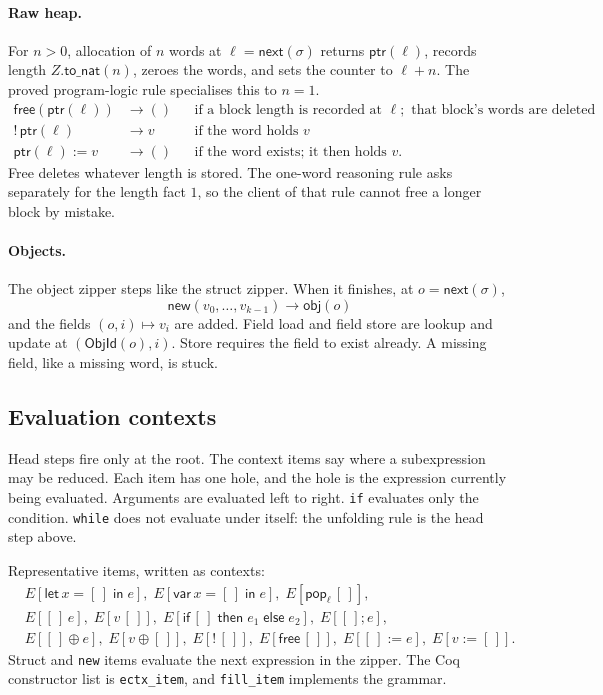 \documentclass[11pt]{article}
\newcommand{\step}{\longrightarrow}
\newcommand{\Unit}{\mathsf{()}}
\begin{document}
\paragraph{Raw heap.}
For \(n>0\), allocation of \(n\) words at \(\ell=\mathsf{next}(\sigma)\) returns \(\mathsf{ptr}(\ell)\), records length \(Z.\mathsf{to\_nat}(n)\), zeroes the words, and sets the counter to \(\ell+n\).
The proved program-logic rule specialises this to \(n=1\).
\begin{align*}
\mathsf{free}(\mathsf{ptr}(\ell))
  &\step \Unit
  &&\text{if a block length is recorded at }\ell;
     \text{ that block's words are deleted}\\
{!}\,\mathsf{ptr}(\ell)
  &\step v
  &&\text{if the word holds }v\\
\mathsf{ptr}(\ell) := v
  &\step \Unit
  &&\text{if the word exists; it then holds }v.
\end{align*}
Free deletes whatever length is stored.
The one-word reasoning rule asks separately for the length fact \(1\), so the client of that rule cannot free a longer block by mistake.

\paragraph{Objects.}
The object zipper steps like the struct zipper.
When it finishes, at \(o=\mathsf{next}(\sigma)\),
\[
\mathsf{new}(v_0,\ldots,v_{k-1})
\step
\mathsf{obj}(o)
\]
and the fields \((o,i)\mapsto v_i\) are added.
Field load and field store are lookup and update at \((\mathsf{ObjId}(o), i)\).
Store requires the field to exist already.
A missing field, like a missing word, is stuck.

\subsection{Evaluation contexts}

Head steps fire only at the root.
The context items say where a subexpression may be reduced.
Each item has one hole, and the hole is the expression currently being evaluated.
Arguments are evaluated left to right.
\texttt{if} evaluates only the condition.
\texttt{while} does not evaluate under itself: the unfolding rule is the head step above.

Representative items, written as contexts:
\[
\begin{aligned}
&E[\mathsf{let}\,x = [\,]\;\mathsf{in}\;e],\;
 E[\mathsf{var}\,x = [\,]\;\mathsf{in}\;e],\;
 E[\mathsf{pop}_{\ell}\,[\,]],\\
&E[[\,]\,e],\; E[v\,[\,]],\;
 E[\mathsf{if}\,[\,]\;\mathsf{then}\;e_1\;\mathsf{else}\;e_2],\;
 E[[\,];e],\\
&E[[\,]\oplus e],\; E[v\oplus [\,]],\;
 E[{!}\,[\,]],\; E[\mathsf{free}\,[\,]],\;
 E[[\,]:=e],\; E[v:=[\,]].
\end{aligned}
\]
Struct and \texttt{new} items evaluate the next expression in the zipper.
The Coq constructor list is \texttt{ectx\_item}, and \texttt{fill\_item} implements the grammar.
\end{document}
